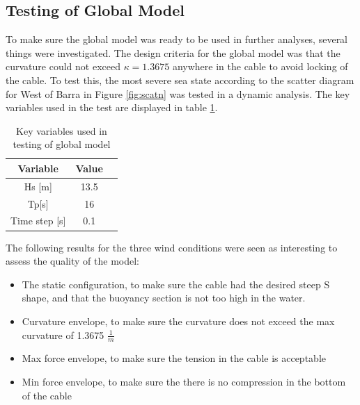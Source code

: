 \subsection{Testing of Global Model}
To make sure the global model was ready to be used in further analyses, several things were investigated. The design criteria for the global model was that the curvature could not exceed $\kappa=1.3675$ anywhere in the cable to avoid locking of the cable. To test this, the most severe sea state according to the scatter diagram for West of Barra in Figure \ref{fig:scatn} was tested in a dynamic analysis. The key variables used in the test are displayed in table \ref{table:testglob}.

\begin{table} [H]
\centering
\begin{tabular}{ |c|c|c|}
\hline
Variable & Value \\
 \hline
 \hline
Hs [m] & 13.5\\
Tp[s] & 16 \\
Time step [s] & 0.1 \\
 \hline
\end{tabular}
\caption{Key variables used in testing of global model}
\label{table:testglob}
\end{table}

The following results for the three wind conditions were seen as interesting to assess the quality of the model:
\begin{itemize}
    \item The static configuration, to make sure the cable had the desired steep S shape, and that the buoyancy section is not too high in the water.
    \item Curvature envelope, to make sure the curvature does not exceed the max curvature of 1.3675 $\frac{1}{m}$
    \item Max force envelope, to make sure the tension in the cable is acceptable
    \item Min force envelope, to make sure the there is no compression in the bottom of the cable
\end{itemize}

